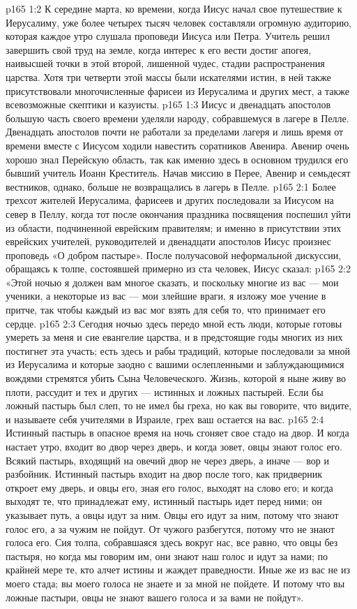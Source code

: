 \vs p165 1:2 К середине марта, ко времени, когда Иисус начал свое путешествие к Иерусалиму, уже более четырех тысяч человек составляли огромную аудиторию, которая каждое утро слушала проповеди Иисуса или Петра. Учитель решил завершить свой труд на земле, когда интерес к его вести достиг апогея, наивысшей точки в этой второй, лишенной чудес, стадии распространения царства. Хотя три четверти этой массы были искателями истин, в ней также присутствовали многочисленные фарисеи из Иерусалима и других мест, а также всевозможные скептики и казуисты.
\vs p165 1:3 Иисус и двенадцать апостолов большую часть своего времени уделяли народу, собравшемуся в лагере в Пелле. Двенадцать апостолов почти не работали за пределами лагеря и лишь время от времени вместе с Иисусом ходили навестить соратников Авенира. Авенир очень хорошо знал Перейскую область, так как именно здесь в основном трудился его бывший учитель Иоанн Креститель. Начав миссию в Перее, Авенир и семьдесят вестников, однако, больше не возвращались в лагерь в Пелле.
\vs p165 2:1 Более трехсот жителей Иерусалима, фарисеев и других последовали за Иисусом на север в Пеллу, когда тот после окончания праздника посвящения поспешил уйти из области, подчиненной еврейским правителям; и именно в присутствии этих еврейских учителей, руководителей и двенадцати апостолов Иисус произнес проповедь «О добром пастыре». После получасовой неформальной дискуссии, обращаясь к толпе, состоявшей примерно из ста человек, Иисус сказал:
\vs p165 2:2 \pc «Этой ночью я должен вам многое сказать, и поскольку многие из вас --- мои ученики, а некоторые из вас --- мои злейшие враги, я изложу мое учение в притче, так чтобы каждый из вас мог взять для себя то, что принимает его сердце.
\vs p165 2:3 Сегодня ночью здесь передо мной есть люди, которые готовы умереть за меня и сие евангелие царства, и в предстоящие годы многих из них постигнет эта участь; есть здесь и рабы традиций, которые последовали за мной из Иерусалима и которые заодно с вашими ослепленными и заблуждающимися вождями стремятся убить Сына Человеческого. Жизнь, которой я ныне живу во плоти, рассудит и тех и других --- истинных и ложных пастырей. Если бы ложный пастырь был слеп, то не имел бы греха, но как вы говорите, что видите, и называете себя учителями в Израиле, грех ваш остается на вас.
\vs p165 2:4 Истинный пастырь в опасное время на ночь сгоняет свое стадо на двор. И когда настает утро, входит во двор через дверь, и когда зовет, овцы знают голос его. Всякий пастырь, входящий на овечий двор не через дверь, а иначе --- вор и разбойник. Истинный пастырь входит на двор после того, как придверник откроет ему дверь, и овцы его, зная его голос, выходят на слово его; и когда выходят те, что принадлежат ему, истинный пастырь идет перед ними; он указывает путь, а овцы идут за ним. Овцы его идут за ним, потому что знают голос его, а за чужим не пойдут. От чужого разбегутся, потому что не знают голоса его. Сия толпа, собравшаяся здесь вокруг нас, все равно, что овцы без пастыря, но когда мы говорим им, они знают наш голос и идут за нами; по крайней мере те, кто алчет истины и жаждет праведности. Иные же из вас не из моего стада; вы моего голоса не знаете и за мной не пойдете. И потому что вы ложные пастыри, овцы не знают вашего голоса и за вами не пойдут».
